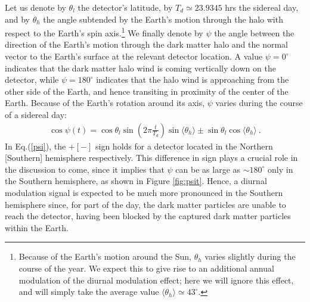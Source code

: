 \documentclass[12pt]{article}
\begin{document}
Let us denote by $\theta _l$ the detector's latitude, by $T _d \simeq 23.9345$ hrs the sidereal day, and by $\theta _h$ the angle subtended by the Earth's motion through the halo with respect to the Earth's spin axis.\footnote{Because of the Earth's motion around the Sun, $\theta _h$ varies slightly during the course of the year. We expect this to give rise to an additional annual modulation of the diurnal modulation effect; here we will ignore this effect, and will simply take the average value $\langle \theta _h \rangle \simeq 43 ^{\circ}$.} We finally denote by $\psi$ the angle between the direction of the Earth's motion through the dark matter halo and the normal vector to the Earth's surface at the relevant detector location. A value $\psi = 0 ^{\circ}$ indicates that the dark matter halo wind is coming vertically down on the detector, while $\psi = 180 ^{\circ}$ indicates that the halo wind is approaching from the other side of the Earth, and hence transiting in proximity of the center of the Earth. Because of the Earth's rotation around its axis, $\psi$ varies during the course of a sidereal day:
%
\begin{eqnarray}
\cos \psi (t) = \cos \theta _l\sin \left ( 2\pi \frac{t}{T _d} \right )\sin \langle \theta _h \rangle \pm \sin \theta _l\cos \langle \theta _h \rangle \ .
\label{psi}
\end{eqnarray}
%
In Eq.(\ref{psi}), the $+ [-]$ sign holds for a detector located in the Northern [Southern] hemisphere respectively. This difference in sign plays a crucial role in the discussion to come, since it implies that $\psi$ can be as large as $\sim 180 ^{\circ}$ only in the Southern hemisphere, as shown in Figure \ref{fig:psit}. Hence, a diurnal modulation signal is expected to be much more pronounced in the Southern hemisphere since, for part of the day, the dark matter particles are unable to reach the detector, having been blocked by the captured dark matter particles within the Earth.
\end{document}

